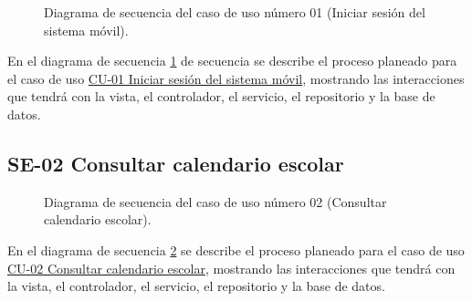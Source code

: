 \begin{figure}[htbp!]
	\begin{center}
		\caption{Diagrama de secuencia del caso de uso número 01 (Iniciar sesión del sistema móvil).}
		\label{fig:Diagrama de secuencia CU-01}
	\end{center}
\end{figure}

En el diagrama de secuencia \ref{fig:Diagrama de secuencia CU-01} de secuencia se describe el proceso planeado para el caso de uso \hyperlink{CU-01}{CU-01 Iniciar sesión del sistema móvil}, mostrando las interacciones que tendrá con la vista, el controlador, el servicio, el repositorio y la base de datos.

\newpage

\subsection{SE-02 Consultar calendario escolar}

\begin{figure}[htbp!]
	\begin{center}
		\caption{Diagrama de secuencia del caso de uso número 02 (Consultar calendario escolar).}
		\label{fig:Diagrama de secuencia CU-02}
	\end{center}
\end{figure}

En el diagrama de secuencia \ref{fig:Diagrama de secuencia CU-02} se describe el proceso planeado para el caso de uso \hyperlink{CU-02}{CU-02 Consultar calendario escolar}, mostrando las interacciones que tendrá con la vista, el controlador, el servicio, el repositorio y la base de datos.

